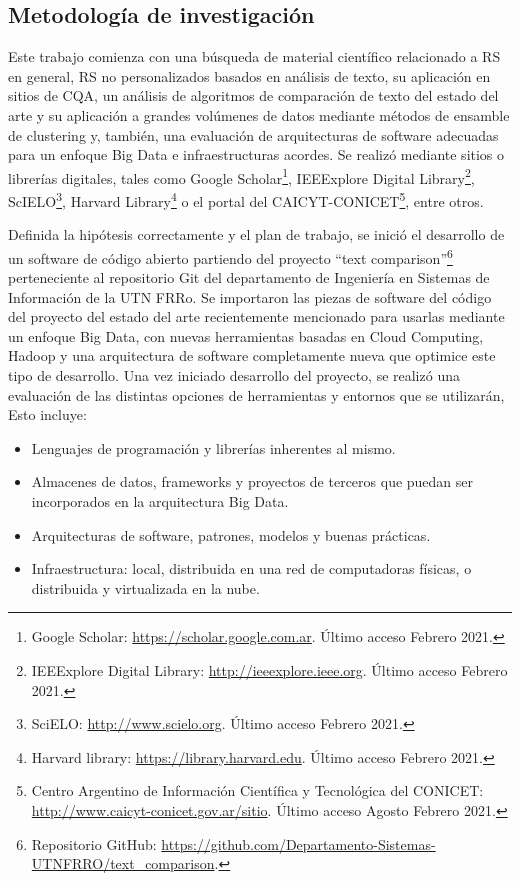 \subsection{Metodología de investigación}
Este trabajo comienza con una búsqueda de material científico relacionado a RS en general, RS no personalizados basados en análisis de texto, su aplicación en sitios de CQA, un análisis de algoritmos de comparación de texto del estado del arte y su aplicación a grandes volúmenes de datos mediante métodos de ensamble de clustering y, también, una evaluación de arquitecturas de software adecuadas para un enfoque Big Data e infraestructuras acordes. Se realizó mediante sitios o librerías digitales, tales como Google Scholar\footnote{Google Scholar: \url{https://scholar.google.com.ar}. Último acceso Febrero 2021.}, IEEExplore Digital Library\footnote{IEEExplore Digital Library: \url{http://ieeexplore.ieee.org}. Último acceso Febrero 2021.}, ScIELO\footnote{SciELO: \url{http://www.scielo.org}. Último acceso Febrero 2021.}, Harvard Library\footnote{Harvard library: \url{https://library.harvard.edu}. Último acceso Febrero 2021.} o el portal del CAICYT-CONICET\footnote{Centro Argentino de Información Científica y Tecnológica del CONICET: \url{http://www.caicyt-conicet.gov.ar/sitio}. Último acceso Agosto Febrero 2021.}, entre otros.

\bigskip Definida la hipótesis correctamente y el plan de trabajo, se inició el desarrollo de un software de código abierto partiendo del proyecto ``text comparison''\footnote{Repositorio GitHub: \url{https://github.com/Departamento-Sistemas-UTNFRRO/text_comparison}.} perteneciente al repositorio Git del departamento de Ingeniería en Sistemas de Información de la UTN FRRo. Se importaron las piezas de software del código del proyecto del estado del arte recientemente mencionado para usarlas mediante un enfoque Big Data, con nuevas herramientas basadas en Cloud Computing, Hadoop y una arquitectura de software completamente nueva que optimice este tipo de desarrollo. Una vez iniciado desarrollo del proyecto, se realizó una evaluación de las distintas opciones de herramientas y entornos que se utilizarán, Esto incluye:

\begin{itemize}
	\item Lenguajes de programación y librerías inherentes al mismo.
	\item Almacenes de datos, frameworks y proyectos de terceros que puedan ser incorporados en la arquitectura Big Data.
	\item Arquitecturas de software, patrones, modelos y buenas prácticas.
	\item Infraestructura: local, distribuida en una red de computadoras físicas, o distribuida y virtualizada en la nube.
\end{itemize}

